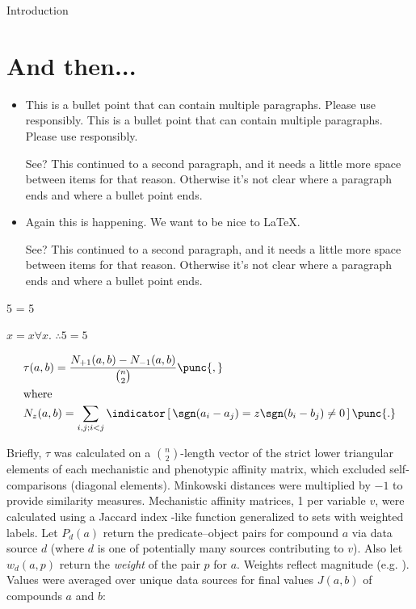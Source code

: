 \begin{MainChapter}{Introduction}
\newpage
\section{And then...}

\begin{itemize}[long]  %
    \item
    This is a bullet point that can contain multiple paragraphs. Please use responsibly.
    This is a bullet point that can contain multiple paragraphs. Please use responsibly.
    
    See? This continued to a second paragraph, and it needs a little more space between items for that reason. Otherwise it's not clear where a paragraph ends and where a bullet point ends.
    
    \item Again this is happening. We want to be nice to LaTeX.
    
    See? This continued to a second paragraph, and it needs a little more space between items for that reason. Otherwise it's not clear where a paragraph ends and where a bullet point ends.
\end{itemize}

\begin{Theorem}[label=mythm, name=Fiveness]
5 = 5
\end{Theorem}

\begin{Proof}  %
$x = x \forall x$. $\therefore 5 = 5$
\end{Proof}


\begin{align}
    & \tau(a, b) = \frac{ N_{+1}(a,b) - N_{-1}(a,b)}{\textstyle \binom{n}{2}}
    \label{eqn:kappa}\punc{,}\\
    \shortintertext{where}
    & N_z(a,b) = \sum_{i,j;i<j}\indicator \left[ \, \sgn(a_i - a_j) = z \sgn(b_i - b_j) \neq 0 \, \right]
    \punc{.}  %
\end{align}

Briefly, $\tau$ was calculated on a $\binom{n}{2}$-length vector of the strict lower triangular elements of each mechanistic and phenotypic affinity matrix, which excluded self-comparisons (diagonal elements).
Minkowski distances were multiplied by $-1$ to provide similarity measures. Mechanistic affinity matrices, 1 per variable $v$, were calculated using a Jaccard index -like function generalized to sets with weighted labels.
Let $P_d(a)$ return the predicate--object pairs for compound $a$ via data source $d$ (where $d$ is one of potentially many sources contributing to $v$). Also let $w_d(a, p)$ return the \emph{weight} of the pair $p$ for $a$. Weights reflect magnitude (e.g. ).
Values were averaged over unique data sources for final values ${J}(a, b)$ of compounds $a$ and $b$:


\end{MainChapter}
